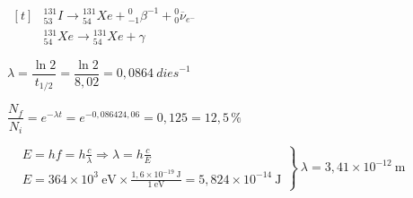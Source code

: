 \begin{solapartat}
$\begin{aligned}[t]
&{}^{131}_{53}I \rightarrow {}^{131}_{54}Xe + {}^{0}_{-1}\beta^{-1} + {}^{0}_{0}\overline{\nu}_{e^-}\\
&{}^{131}_{54}Xe \rightarrow {}^{131}_{54}Xe + \gamma
\end{aligned}$

\medskip
{} $\lambda = \dfrac{\ln 2}{t_{1/2}} = \dfrac{\ln 2}{8,02} = 0,0864\ \mathit{dies}^{-1}$

\medskip
 $\dfrac{N_f}{N_i} = e^{-\lambda t} = e^{-0,086424,06} = 0,125 = 12,5\,\%$
\end{solapartat}

\begin{solapartat}
$\left.\begin{aligned}
&E = hf = h\frac{c}{\lambda} \Rightarrow \lambda = h\frac{c}{E}\\[4pt]
&E = 364\times 10^{3}\ \mathrm{eV}\times\frac{1,6\times 10^{-19}\ \mathrm{J}}{1\ \mathrm{eV}} = 5,824\times 10^{-14}\ \mathrm{J}
\end{aligned}\right\}\ \lambda = 3,41\times 10^{-12}\ \mathrm{m}$ 
\end{solapartat}
